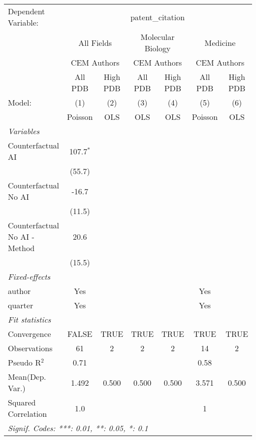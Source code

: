 \begingroup
\centering
\begin{tabular}{lcccccc}
   \tabularnewline \midrule \midrule
   Dependent Variable: & \multicolumn{6}{c}{patent\_citation}\\
 & \multicolumn{2}{c}{All Fields} & \multicolumn{2}{c}{Molecular Biology} & \multicolumn{2}{c}{Medicine} \\
\cmidrule(lr){2-3} \cmidrule(lr){4-5} \cmidrule(lr){6-7}
 & \multicolumn{2}{c}{CEM Authors} & \multicolumn{2}{c}{CEM Authors} & \multicolumn{2}{c}{CEM Authors} \\
\cmidrule(lr){2-3} \cmidrule(lr){4-5} \cmidrule(lr){6-7}
 & \multicolumn{1}{c}{All PDB} & \multicolumn{1}{c}{High PDB} & \multicolumn{1}{c}{All PDB} & \multicolumn{1}{c}{High PDB} & \multicolumn{1}{c}{All PDB} & \multicolumn{1}{c}{High PDB} \\
\cmidrule(lr){2-2} \cmidrule(lr){3-3} \cmidrule(lr){4-4} \cmidrule(lr){5-5} \cmidrule(lr){6-6} \cmidrule(lr){7-7}
   Model:                        & (1)         & (2)  & (3)  & (4)  & (5)     & (6)\\  
                                 &  Poisson    & OLS  & OLS  & OLS  & Poisson & OLS\\  
   \midrule
   \emph{Variables}\\
   Counterfactual AI             & 107.7$^{*}$ &      &      &      &         &   \\   
                                 & (55.7)      &      &      &      &         &   \\   
   Counterfactual No AI          & -16.7       &      &      &      &         &   \\   
                                 & (11.5)      &      &      &      &         &   \\   
   Counterfactual No AI - Method & 20.6        &      &      &      &         &   \\   
                                 & (15.5)      &      &      &      &         &   \\   
   \midrule
   \emph{Fixed-effects}\\
   author                        & Yes         &      &      &      & Yes     & \\  
   quarter                       & Yes         &      &      &      & Yes     & \\  
   \midrule
   \emph{Fit statistics}\\
   Convergence                   &FALSE        & TRUE & TRUE & TRUE & TRUE    & TRUE\\  
   Observations                  & 61          & 2    & 2    & 2    & 14      & 2\\  
   Pseudo R$^2$                  & 0.71        &      &      &      & 0.58    & \\  
Mean(Dep. Var.) & 1.492 & 0.500 & 0.500 & 0.500 & 3.571 & 0.500 \\
   Squared Correlation           & 1.0         &      &      &      & 1       & \\  
   \midrule \midrule
   \multicolumn{7}{l}{\emph{Signif. Codes: ***: 0.01, **: 0.05, *: 0.1}}\\
\end{tabular}
\par\endgroup
